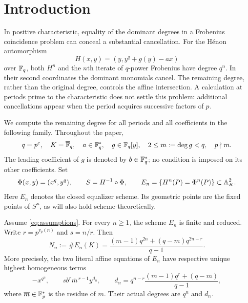 \section{Introduction}

In positive characteristic, equality of the dominant degrees in a
Frobenius coincidence problem can conceal a substantial cancellation.
For the H\'enon automorphism
\begin{equation}\label{eq:H-intro}
 H(x,y)=(y,y^q+g(y)-ax)
\end{equation}
over $\mathbb F_q$, both $H^n$ and the $n$th iterate of $q$-power Frobenius
have degree $q^n$. In their second coordinates the dominant monomials
cancel. The remaining degree, rather than the original degree, controls
the affine intersection. A calculation at periods prime to the
characteristic does not settle this problem: additional cancellations
appear when the period acquires successive factors of $p$.

We compute the remaining degree for all periods and all coefficients in
the following family. Throughout the paper,
\begin{equation}\label{eq:assumptions}
 q=p^e,\quad K=\overline{\mathbb F}_q,\quad
 a\in\mathbb F_q^*,\quad g\in\mathbb F_q[y],\quad
 2\le m:=\deg g<q,\quad p\nmid m.
\end{equation}
The leading coefficient of $g$ is denoted by $b\in\mathbb F_q^*$; no condition
is imposed on its other coefficients. Set
\[
 \Phi(x,y)=(x^q,y^q),\qquad S=H^{-1}\circ\Phi,
 \qquad E_n=\{H^n(P)=\Phi^n(P)\}\subset\mathbb A^2_K.
\]
Here $E_n$ denotes the closed equalizer scheme. Its geometric points are
the fixed points of $S^n$, as will also hold scheme-theoretically.

\begin{theorem}\label{thm:count}
Assume \eqref{eq:assumptions}. For every $n\ge1$, the scheme $E_n$ is
finite and reduced. Write $r=p^{v_p(n)}$ and $s=n/r$. Then
\begin{equation}\label{eq:count}
 N_n:=\#E_n(K)
 =\frac{(m-1)q^{2n}+(q-m)q^{2n-r}}{q-1}.
\end{equation}
More precisely, the two literal affine equations of $E_n$ have respective
unique highest homogeneous terms
\begin{equation}\label{eq:top-intro}
 -x^{q^n},\qquad s b^r\overline m^{\,r-1}y^{d_n},
 \qquad
 d_n=q^{n-r}\frac{(m-1)q^r+(q-m)}{q-1},
\end{equation}
where $\overline m\in\mathbb F_p^*$ is the residue of $m$.
Their actual degrees are $q^n$ and $d_n$.
\end{theorem}

